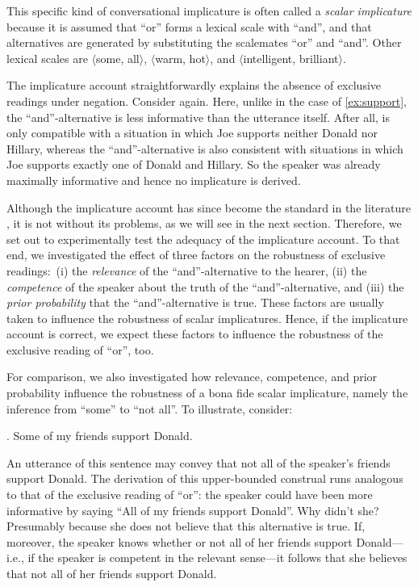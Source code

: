 \documentclass[12pt]{article}
\begin{document}
This specific kind of conversational implicature is often called a \emph{scalar implicature} because it is assumed that ``or'' forms a lexical scale with ``and'', and that alternatives are generated by substituting the scalemates ``or'' and ``and''. Other lexical scales are $\langle$some, all$\rangle$, $\langle$warm, hot$\rangle$, and $\langle$intelligent, brilliant$\rangle$.

The implicature account straightforwardly explains the absence of exclusive readings under
negation. Consider \LLast again. Here, unlike in the case of \ref{ex:support}, the
``and''-alternative is less informative than the utterance itself. After all, \LLast is only
compatible with a situation in which Joe supports neither Donald nor Hillary, whereas the
``and''-alternative is also consistent with situations in which Joe supports exactly one of
Donald and Hillary. So the speaker was already maximally informative and hence no implicature
is derived.

Although the implicature account has since become the standard in the literature
\citep[e.g.,][]{chevallier2008, chierchia2012, geurts2010, sauerland2004}, it is not
without its problems, as we will see in the next section. Therefore, we set out to
experimentally test the adequacy of the implicature account. To that end, we investigated the
effect of three factors on the robustness of exclusive readings:\ (i) the \emph{relevance} of
the ``and''-alternative to the hearer, (ii) the \emph{competence} of the speaker about the truth
of the ``and''-alternative, and (iii) the \emph{prior probability} that the ``and''-alternative is
true. These factors are usually taken to influence the robustness of scalar
implicatures. Hence, if the implicature account is correct, we expect these factors to
influence the robustness of the exclusive reading of ``or'', too.

For comparison, we also investigated how relevance, competence, and prior probability influence the robustness of a bona fide scalar implicature, namely the inference from ``some'' to ``not all''. To illustrate, consider:

\ex.	Some of my friends support Donald.

An utterance of this sentence may convey that not all of the speaker's friends support
Donald. The derivation of this upper-bounded construal runs analogous to that of the exclusive
reading of ``or'': the speaker could have been more informative by saying ``All of my friends
support Donald''. Why didn't she? Presumably because she does not believe that this alternative
is true. If, moreover, the speaker knows whether or not all of her friends support Donald---i.e., if the speaker is competent in the relevant sense---it
follows that she believes that not all of her friends support Donald.
\end{document}
